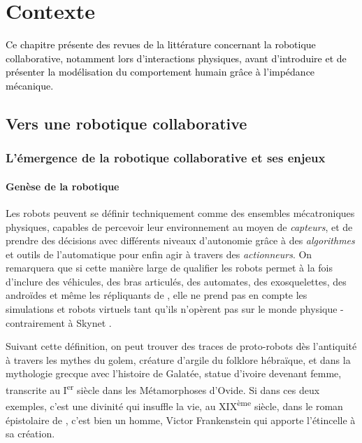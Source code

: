 \chapter{Contexte} \label{chap1}
\minitoc
\textcolor{black}{Ce chapitre présente des revues de la littérature concernant la robotique collaborative, notamment lors d'interactions physiques, avant d'introduire et de présenter la modélisation du comportement humain grâce à l'impédance mécanique.}

\section{Vers une robotique collaborative} \label{chap1_sec_robot}


\subsection{L'émergence de la robotique collaborative et ses enjeux}

\subsubsection{Genèse de la robotique}

Les robots peuvent se définir techniquement comme des ensembles mécatroniques physiques, capables de percevoir leur environnement au moyen de \emph{capteurs}, et de prendre des décisions avec différents niveaux d'autonomie grâce à des \emph{algorithmes} et outils de l'automatique pour enfin agir à travers des \emph{actionneurs}. On remarquera que si cette manière large de qualifier les robots permet à la fois d'inclure des véhicules, des bras articulés, des automates, des exosquelettes, des androïdes et même les répliquants de \textcite{dick_androids_1968}, elle ne prend pas en compte les simulations et robots virtuels tant qu'ils n'opèrent pas sur le monde physique - contrairement à Skynet \parencite{terminator_1984}.

Suivant cette définition, on peut trouver des traces de proto-robots dès l'antiquité à travers les mythes du golem, créature d'argile du folklore hébraïque, et dans la mythologie grecque avec l'histoire de Galatée, statue d'ivoire devenant femme, transcrite au I\textsuperscript{er} siècle dans les Métamorphoses d'Ovide. Si dans ces deux exemples, c'est une divinité qui insuffle la vie, au XIX\textsuperscript{ème} siècle, dans le roman épistolaire de \textcite{shelley_frankenstein_1818}, c'est bien un homme, Victor Frankenstein qui apporte l'étincelle à sa création.

